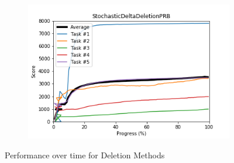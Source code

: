 \documentclass{article} %
\begin{document}
\begin{figure}[!ht]
    \begin{subfigure}[t]{0.5\textwidth}
        \centering
        \includegraphics[width=\textwidth]{images/StochasticDeltaDeletionPRB.png}
    \end{subfigure}%
    \caption{Performance over time for Deletion Methods}
    \label{fig:deletion_performance}
\end{figure}
\end{document}
